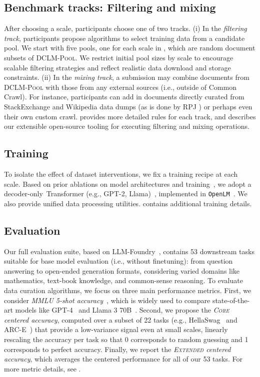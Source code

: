 \documentclass{article}
\newcommand{\rawpool}{\textsc{DCLM-Pool}\xspace}
\newcommand{\llama}{Llama\xspace}
\newcommand{\llamaIII}{\llama 3\xspace}
\newcommand{\lowvar}{\textsc{Core}\xspace}
\newcommand{\lowvartasks}{22\xspace}
\newcommand{\aggscore}{\textsc{Extended}\xspace}
\newcommand{\aggtasks}{53\xspace}
\begin{document}
\subsection{Benchmark tracks: Filtering and mixing}
\label{sec:tracks}
After choosing a scale, participants choose one of two tracks.
(i) In the \emph{filtering track}, participants propose algorithms to select training data from a candidate pool.
We start with five pools, one for each scale in , which are random document subsets of \rawpool.
We restrict initial pool sizes by scale to encourage scalable filtering strategies and reflect realistic data download and storage constraints.
(ii) In the \emph{mixing track}, a submission may combine documents from \rawpool with those from any external sources (i.e., outside of Common Crawl).
For instance, participants can add in documents directly curated from StackExchange and Wikipedia data dumps (as is done by RPJ \citep{rpj}) or perhaps even their own custom crawl.
 provides more detailed rules for each track, and  describes our extensible open-source tooling for executing filtering and mixing operations.

\subsection{Training}
\label{sec:training}
To isolate the effect of dataset interventions, we fix a training recipe at each scale.
Based on prior ablations on model architectures and training~\citep{Radford2019LanguageMA,wortsman2023small,gadre2024LanguageMS,scao2022language,chinchilla,gpt3,Chowdhery2022PaLMSL,llama,llama2,llama3}, we adopt a decoder-only~Transformer (e.g., GPT-2, Llama)~\citep{transformer,llama,Radford2019LanguageMA}, implemented in \texttt{OpenLM}~\citep{open_lm}.
We also provide unified data processing utilities.
 contains additional training details.

\subsection{Evaluation}
\label{sec:evaluation}
Our full evaluation suite, based on LLM-Foundry~\citep{mosaicml}, contains \aggtasks downstream tasks suitable for base model evaluation (i.e., without finetuning): from question answering to open-ended generation formats, considering varied domains like mathematics, text-book knowledge, and common-sense reasoning.
To evaluate data curation algorithms, we focus on three main performance metrics.
First, we consider \emph{MMLU 5-shot accuracy}~\citep{mmlu}, which is widely used to compare state-of-the-art models like GPT-4~\citep{gpt4} and \llamaIII 70B~\citep{llama3}.
Second, we propose the \emph{\lowvar centered accuracy}, computed over a subset of \lowvartasks tasks (e.g., HellaSwag~\citep{hellaswag} and ARC-E~\citep{arc}) that provide a low-variance signal even at small scales, linearly rescaling the accuracy per task so that 0 corresponds to random guessing and 1 corresponds to perfect accuracy.
Finally, we report the \emph{\aggscore centered accuracy}, which averages the centered performance for all of our \aggtasks tasks.
For more metric details, see .
\end{document}
